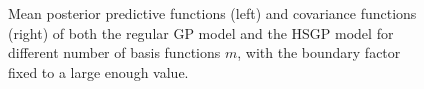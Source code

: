 \documentclass[]{interact}
\theoremstyle{plain}%
\theoremstyle{definition}
\theoremstyle{remark}
\begin{document}
\begin{figure}
\caption{Mean posterior predictive functions (left) and covariance functions (right) of both the regular GP model and the HSGP model for different number of basis functions $m$, with the boundary factor fixed to a large enough value.}
  \label{fig1_Post_J}
\end{figure}
\end{document}
